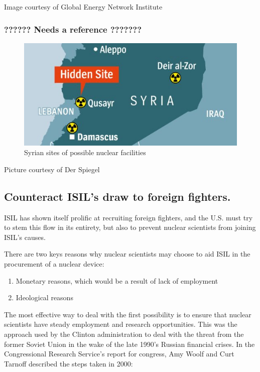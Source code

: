 \documentclass{report}
\begin{document}
Image courtesy of Global Energy Network Institute




\subsubsection{??????  Needs a reference   ???????}

\begin{figure}[H]
 \centering
 \includegraphics[trim = 0cm 0cm 0cm 0cm, clip,scale=0.7]{./figures/syria_nuke_facilities.jpg}
   \caption{Syrian sites of possible nuclear facilities}
     \label{fig:syria_nuke_facilities}
\end{figure}




Picture courtesy of Der Spiegel






\subsection{Counteract ISIL's draw to foreign fighters.}

ISIL has shown itself prolific at recruiting foreign fighters, and the U.S. must try to stem this flow in its entirety, but also to prevent nuclear scientists from joining ISIL's causes. 

There are two keys reasons why nuclear scientists may choose to aid ISIL in the procurement of a nuclear device:

\begin{enumerate}
  \item Monetary reasons, which would be a result of lack of employment
  \item Ideological reasons
\end{enumerate}


The most effective way to deal with the first possibility is to ensure that nuclear scientists have steady employment and research opportunities. This was the approach used by the Clinton administration to deal with the threat from the former Soviet Union in the wake of the late 1990's Russian financial crises. In the Congressional Research Service's report for congress, Amy Woolf and Curt Tarnoff described the steps taken in 2000:
\end{document}
